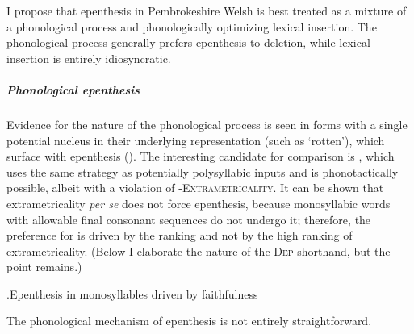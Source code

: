 I propose that epenthesis in Pembrokeshire Welsh is best treated as a mixture of a phonological process and phonologically optimizing lexical insertion. The phonological process generally prefers epenthesis to deletion, while lexical insertion is entirely idiosyncratic.

\subparagraph{Phonological epenthesis}
\label{sec:motivation}

Evidence for the nature of the phonological process is seen in forms with a single potential nucleus in their underlying representation (such as  `rotten'), which surface with epenthesis (\ipa{[ˈpuːdur]}). The interesting candidate for comparison is \ipa{[ˈpuːd]}, which uses the same strategy as potentially polysyllabic inputs and is phonotactically possible, albeit with a violation of {\sy-}\hspace{0pt}\textsc{Extrametricality}. It can be shown that extrametricality \emph{per se} does not force epenthesis, because monosyllabic words with allowable final consonant sequences do not undergo it; therefore, the preference for \ipa{[ˈpuːdur]} is driven by the ranking  and not by the high ranking of extrametricality. (Below I elaborate the nature of the \textsc{Dep} shorthand, but the point remains.)

\ex.\label{ex:epenthesis-tableau}Epenthesis in monosyllables driven by faithfulness\\
\begin{OTmultitableau}{4}
\OTmcandrow[/pudr/]{[(ˈpudr)]}{*!,,,*}
\OTmcandrow{[(ˈpuːd)]}{,*!,,*}
\OTmcandrow[/forð/][\OThand]{[(ˈforð)]}{,,,*}
\OTmcandrow{[ˈ(foːr)]}{,*!,,*}
\end{OTmultitableau}

The phonological mechanism of epenthesis is not entirely straightforward.


